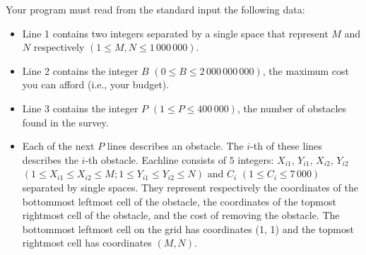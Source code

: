 Your program must read from the standard input the following data:
\begin{itemize}
\item Line 1 contains two integers separated by a single space that represent $M$ and $N$ respectively $(1 \le M, N \le 1\,000\,000)$.
\item Line 2 contains the integer $B$ $(0 \le B \le 2\,000\,000\,000)$, the maximum cost you can afford (i.e., your budget).
\item Line 3 contains the integer $P$ $(1 \le P \le 400\,000)$, the number of obstacles found in the survey.
\item Each of the next $P$ lines describes an obstacle. The $i$-th of these lines describes the $i$-th obstacle. Eachline consists of $5$ integers: $X_{i1}$, $Y_{i1}$, $X_{i2}$, $Y_{i2}$ $(1 \le X_{i1} \le X_{i2} \le M; 1 \le Y_{i1} \le Y_{i2} \le N)$ and $C_i$ $(1 \le C_i \le 7\,000)$ separated by single spaces. They represent
respectively the coordinates of the bottommost leftmost cell of the obstacle, the coordinates of the topmost rightmost cell of the obstacle, and the cost of removing the obstacle. The bottommost leftmost cell on the grid has coordinates (1, 1) and the topmost rightmost cell has coordinates $(M, N)$.
\end{itemize}